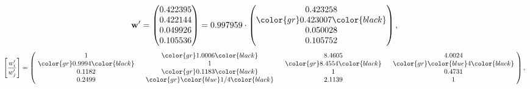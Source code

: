 \begin{example}
\begin{equation*}
\mathbf{w}^{\prime} =
\begin{pmatrix}
0.422395\\
0.422144\\
0.049926\\
0.105536
\end{pmatrix} =
0.997959\cdot
\begin{pmatrix}
0.423258\\
\color{gr} 0.423007\color{black} \\
0.050028\\
0.105752
\end{pmatrix},
\end{equation*}
\begin{equation*}
\left[ \frac{{w}^{\prime}_i}{{w}^{\prime}_j} \right] =
\begin{pmatrix}
$\,\,$ 1 $\,\,$ & $\,\,$\color{gr} 1.0006\color{black} $\,\,$ & $\,\,$8.4605$\,\,$ & $\,\,$4.0024$\,\,$ \\
$\,\,$\color{gr} 0.9994\color{black} $\,\,$ & $\,\,$ 1 $\,\,$ & $\,\,$\color{gr} 8.4554\color{black} $\,\,$ & $\,\,$\color{gr} \color{blue} 4\color{black}   $\,\,$ \\
$\,\,$0.1182$\,\,$ & $\,\,$\color{gr} 0.1183\color{black} $\,\,$ & $\,\,$ 1 $\,\,$ & $\,\,$0.4731 $\,\,$ \\
$\,\,$0.2499$\,\,$ & $\,\,$\color{gr} \color{blue}  1/4\color{black} $\,\,$ & $\,\,$2.1139$\,\,$ & $\,\,$ 1  $\,\,$ \\
\end{pmatrix},
\end{equation*}
\end{example}
\newpage

